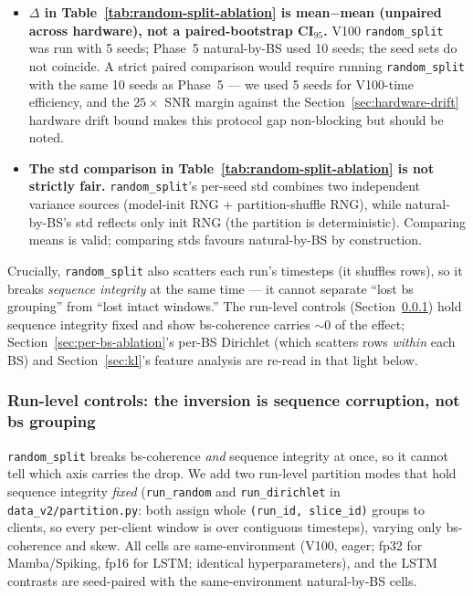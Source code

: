 \documentclass[journal]{IEEEtran}
\begin{document}
\begin{itemize}
  \item \textbf{$\Delta$ in Table~\ref{tab:random-split-ablation} is mean$-$mean (unpaired across hardware), not a paired-bootstrap CI$_{95}$.} V100 \lstinline|random_split| was run with 5 seeds; Phase~5 natural-by-BS used 10 seeds; the seed sets do not coincide. A strict paired comparison would require running \lstinline|random_split| with the same 10 seeds as Phase~5 --- we used 5 seeds for V100-time efficiency, and the $25\times$ SNR margin against the Section~\ref{sec:hardware-drift} hardware drift bound makes this protocol gap non-blocking but should be noted.
  \item \textbf{The std comparison in Table~\ref{tab:random-split-ablation} is not strictly fair.} \lstinline|random_split|'s per-seed std combines two independent variance sources (model-init RNG + partition-shuffle RNG), while natural-by-BS's std reflects only init RNG (the partition is deterministic). Comparing means is valid; comparing stds favours natural-by-BS by construction.
\end{itemize}

Crucially, \lstinline|random_split| also scatters each run's timesteps (it shuffles rows), so it breaks \emph{sequence integrity} at the same time --- it cannot separate ``lost bs grouping'' from ``lost intact windows.'' The run-level controls (Section~\ref{sec:run-level}) hold sequence integrity fixed and show bs-coherence carries ${\sim}0$ of the effect; Section~\ref{sec:per-bs-ablation}'s per-BS Dirichlet (which scatters rows \emph{within} each BS) and Section~\ref{sec:kl}'s feature analysis are re-read in that light below.

\subsubsection{Run-level controls: the inversion is sequence corruption, not bs grouping}\label{sec:run-level}

\lstinline|random_split| breaks bs-coherence \emph{and} sequence integrity at once, so it cannot tell which axis carries the drop. We add two run-level partition modes that hold sequence integrity \emph{fixed} (\lstinline|run_random| and \lstinline|run_dirichlet| in \lstinline|data_v2/partition.py|: both assign whole \lstinline|(run_id, slice_id)| groups to clients, so every per-client window is over contiguous timesteps), varying only bs-coherence and skew. All cells are same-environment (V100, eager; fp32 for Mamba/Spiking, fp16 for LSTM; identical hyperparameters), and the LSTM contrasts are seed-paired with the same-environment natural-by-BS cells.
\end{document}
